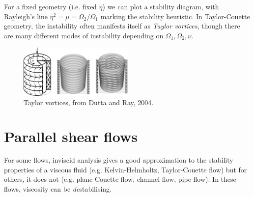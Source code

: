 \documentclass{jknotes}
\begin{document}
For a fixed geometry (i.e. fixed $\eta$) we can plot a stability diagram, with
Rayleigh's line $\eta^2 = \mu = \Omega_2 / \Omega_1$ marking the stability
heuristic. In Taylor-Couette geometry, the instability often manifests itself
as \emph{Taylor vortices}, though there are many different modes of
instability depending on $\Omega_1, \Omega_2, \nu$.

\begin{figure}
	\centering
	\includegraphics[width=0.5\textwidth]{taylor_vortices.jpg}
	\caption{Taylor vortices, from Dutta and Ray, 2004.}
\end{figure}

\section{Parallel shear flows}
For some flows, inviscid analysis gives a good approximation to the stability
properties of a viscous fluid (e.g. Kelvin-Helmholtz, Taylor-Couette flow) but
for others, it does not (e.g. plane Couette flow, channel flow, pipe  flow).
In these flows, viscosity can be \emph{de}stabilising.

\begin{center}
\end{center}
\end{document}
